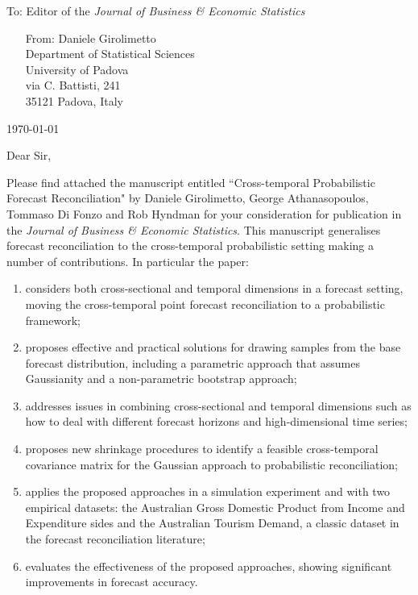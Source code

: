 \documentclass[11pt,a4paper]{letter}
\date{}
\begin{document}
 \begin{letter}{To: Editor of the \textit{Journal of Business \& Economic Statistics}}
\begin{itemize}
	\item[From:] Daniele Girolimetto\\ %
	Department of Statistical Sciences\\
	University of Padova\\
	via C. Battisti, 241\\ 35121 Padova, Italy
\end{itemize}

 \opening{\today\ \\}
 \medskip
Dear Sir,

Please find attached the manuscript entitled ``Cross-temporal Probabilistic Forecast Reconciliation" by Daniele Girolimetto, George Athanasopoulos, Tommaso Di Fonzo and Rob Hyndman for your consideration for publication in the \textit{Journal of Business \& Economic Statistics}. 
This manuscript generalises forecast reconciliation to the cross-temporal probabilistic setting making a number of contributions.
In particular the paper:
\begin{enumerate}
	\item %
	considers both cross-sectional and temporal dimensions in a forecast setting, moving the cross-temporal point forecast reconciliation to a probabilistic framework;
	\item proposes effective and practical solutions for drawing samples from the base forecast distribution, including a parametric approach that assumes Gaussianity and a non-parametric bootstrap approach;
	\item addresses issues in combining cross-sectional and temporal dimensions such as how to deal with different forecast horizons and high-dimensional time series;
	\item proposes new shrinkage procedures to identify a feasible cross-temporal covariance matrix for the Gaussian approach to probabilistic reconciliation;
	\item applies the proposed approaches in a simulation experiment and with two empirical datasets: the Australian Gross Domestic Product from Income and Expenditure sides %
	and the Australian Tourism Demand, a classic dataset in the forecast reconciliation literature;
	\item evaluates the effectiveness of the proposed approaches, showing significant improvements in forecast accuracy.
\end{enumerate}


\end{letter}
\end{document}
